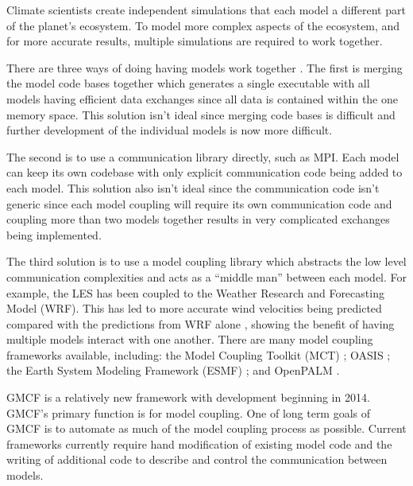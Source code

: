 Climate scientists create independent simulations that each model a different
part of the planet's ecosystem. To model more complex aspects of the ecosystem,
and for more accurate results, multiple simulations are required to work
together.

There are three ways of doing having models work together \cite{Thevenin}. The
first is merging the model code bases together which generates a single
executable with all models having efficient data exchanges since all data is
contained within the one memory space. This solution isn't ideal since merging
code bases is difficult and further development of the individual models is now
more difficult.

The second is to use a communication library directly, such as MPI. Each model
can keep its own codebase with only explicit communication code being added to
each model. This solution also isn't ideal since the communication code isn't
generic since each model coupling will require its own communication code and
coupling more than two models together results in very complicated exchanges
being implemented.

The third solution is to use a model coupling library which abstracts the low
level communication complexities and acts as a ``middle man'' between each
model. For example, the LES has been coupled to the Weather Research and
Forecasting Model (WRF). This has led to more accurate wind velocities being
predicted compared with the predictions from WRF alone
\cite{Kinbara2010,Nakayama1998}, showing the benefit of having multiple models
interact with one another. There are many model coupling frameworks available,
including: the Model Coupling Toolkit (MCT) \cite{Jacob2005,Larson2005}; OASIS
\cite{Valcke2013,Valcke}; the Earth System Modeling Framework (ESMF)
\cite{Ramework2004}; and OpenPALM \cite{Piacentini2011}.

GMCF is a relatively new framework with development beginning in 2014. GMCF's
primary function is for model coupling. One of long term goals of GMCF is to
automate as much of the model coupling process as possible. Current frameworks
currently require hand modification of existing model code and the writing of
additional code to describe and control the communication between models.
